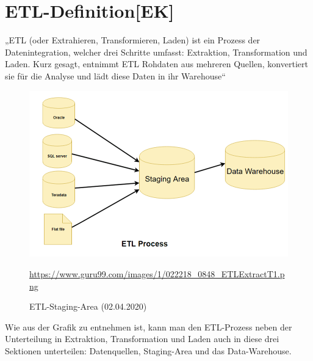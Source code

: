 \newpage
\section{ETL-Definition[EK]}
„ETL (oder Extrahieren, Transformieren, Laden) ist ein Prozess der Datenintegration, welcher drei Schritte umfasst: Extraktion, Transformation und Laden. Kurz gesagt, entnimmt ETL Rohdaten aus mehreren Quellen, konvertiert sie für die Analyse und lädt diese Daten in ihr Warehouse“ \cite{ETL-Explained}
\begin{figure}[H]
    \centering
    \includegraphics[scale=0.5]{images/etl-staging-area.png}
    \caption{ETL-Staging-Area (02.04.2020)}
    \url{https://www.guru99.com/images/1/022218_0848_ETLExtractT1.png}
\end{figure}
Wie aus der Grafik zu entnehmen ist, kann man den ETL-Prozess neben der Unterteilung in Extraktion, Transformation und Laden auch in diese drei Sektionen unterteilen: Datenquellen, Staging-Area und das Data-Warehouse.


\newpage
